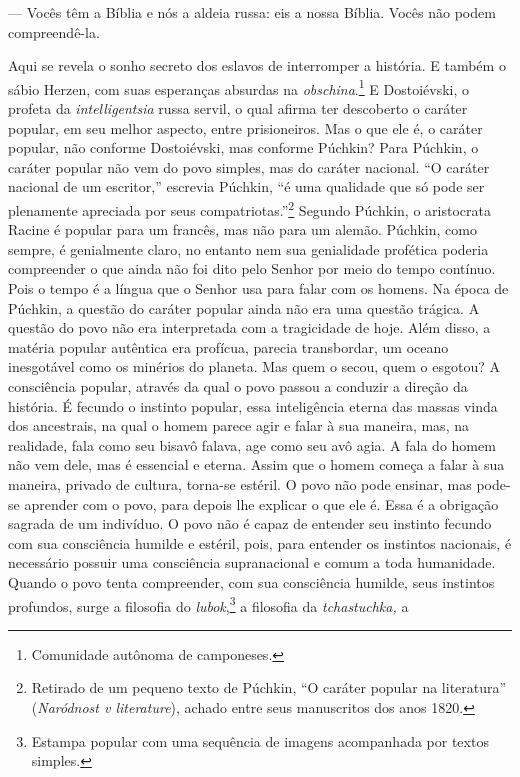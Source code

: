 --- Vocês têm a Bíblia e nós a aldeia russa: eis a nossa Bíblia. Vocês
não podem compreendê-la.

Aqui se revela o sonho secreto dos eslavos de interromper a história. E
também o sábio Herzen, com suas esperanças absurdas na
\emph{obschina}.\footnote{Comunidade autônoma de camponeses.} E
Dostoiévski, o profeta da \emph{intelligentsia} russa servil, o qual
afirma ter descoberto o caráter popular, em seu melhor aspecto, entre
prisioneiros. Mas o que ele é, o caráter popular, não conforme
Dostoiévski, mas conforme Púchkin? Para Púchkin, o caráter popular não
vem do povo simples, mas do caráter nacional. ``O caráter nacional de um
escritor,'' escrevia Púchkin, ``é uma qualidade que só pode ser
plenamente apreciada por seus compatriotas.''\footnote{Retirado de um
  pequeno texto de Púchkin, ``O caráter popular na literatura''
  (\emph{Naródnost v literature}), achado entre seus manuscritos dos
  anos 1820.} Segundo Púchkin, o aristocrata Racine é popular para um
francês, mas não para um alemão. Púchkin, como sempre, é genialmente
claro, no entanto nem sua genialidade profética poderia compreender o
que ainda não foi dito pelo Senhor por meio do tempo contínuo. Pois o
tempo é a língua que o Senhor usa para falar com os homens. Na época de
Púchkin, a questão do caráter popular ainda não era uma questão trágica.
A questão do povo não era interpretada com a tragicidade de hoje. Além
disso, a matéria popular autêntica era profícua, parecia transbordar, um
oceano inesgotável como os minérios do planeta. Mas quem o secou, quem o
esgotou? A consciência popular, através da qual o povo passou a conduzir
a direção da história. É fecundo o instinto popular, essa inteligência
eterna das massas vinda dos ancestrais, na qual o homem parece agir e
falar à sua maneira, mas, na realidade, fala como seu bisavô falava, age
como seu avô agia. A fala do homem não vem dele, mas é essencial e
eterna. Assim que o homem começa a falar à sua maneira, privado de
cultura, torna-se estéril. O povo não pode ensinar, mas pode-se aprender
com o povo, para depois lhe explicar o que ele é. Essa é a obrigação
sagrada de um indivíduo. O povo não é capaz de entender seu instinto
fecundo com sua consciência humilde e estéril, pois, para entender os
instintos nacionais, é necessário possuir uma consciência supranacional
e comum a toda humanidade. Quando o povo tenta compreender, com sua
consciência humilde, seus instintos profundos, surge a filosofia do
\emph{lubok},\footnote{Estampa popular com uma sequência de imagens
  acompanhada por textos simples.} a filosofia da \emph{tchastuchka,} a
